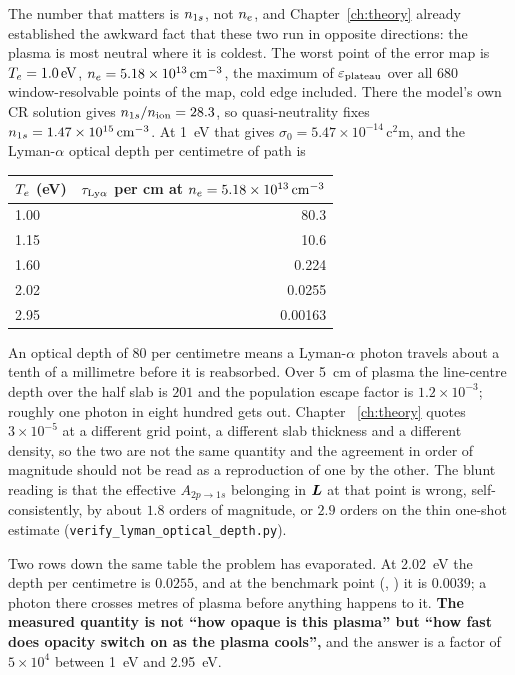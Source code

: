 The number that matters is $n_{1s}$, not $n_e$, and Chapter~\ref{ch:theory}
already established the awkward fact that these two run in opposite directions:
the plasma is most neutral where it is coldest. The worst point of the error map
is $T_e = \SI{1.0}{\electronvolt}$,
$n_e = 5.18\times10^{13}\,\si{\per\cubic\centi\metre}$, the maximum of
$\varepsilon_{\mathrm{plateau}}$ over all $680$ window-resolvable points of the map, cold edge
included. There the model's own CR solution gives $n_{1s}/n_{\mathrm{ion}} = 28.3$, so
quasi-neutrality fixes
$n_{1s} = 1.47\times10^{15}\,\si{\per\cubic\centi\metre}$. At
\SI{1}{\electronvolt} that gives
$\sigma_0 = 5.47\times10^{-14}\,\si{\square\centi\metre}$, and the Lyman-$\alpha$
optical depth per centimetre of path is

\begin{center}
\begin{tabular}{lr}
  \toprule
  $T_e$ (eV) & $\tau_{\rm Ly\alpha}$ per \si{\centi\metre} at
              $n_e = 5.18\times10^{13}\,\si{\per\cubic\centi\metre}$ \\
  \midrule
  1.00 & 80.3 \\
  1.15 & 10.6 \\
  1.60 & 0.224 \\
  2.02 & 0.0255 \\
  2.95 & 0.00163 \\
  \bottomrule
\end{tabular}
\end{center}

\noindent An optical depth of $80$ per centimetre means a Lyman-$\alpha$ photon
travels about a tenth of a millimetre before it is reabsorbed. Over
\SI{5}{\centi\metre} of plasma the line-centre depth
over the half slab is $201$ and the population escape factor is
$1.2\times10^{-3}$; roughly one photon in eight hundred gets out. Chapter~%
\ref{ch:theory} quotes $3\times10^{-5}$ at a different grid point, a different
slab thickness and a different density, so the two are not the same quantity and
the agreement in order of magnitude should not be read as a reproduction of
one by the other.
The blunt reading is that the effective $A_{2p\to1s}$ belonging in $\bm{L}$ at
that point is wrong, self-consistently, by about $1.8$ orders of magnitude, or
$2.9$ orders on the thin one-shot estimate
(\texttt{verify\_lyman\_optical\_depth.py}).

Two rows down the same table the problem has evaporated. At
\SI{2.02}{\electronvolt} the depth per centimetre is $0.0255$, and at the
benchmark point (\benchTe, \benchne) it is $0.0039$; a photon there crosses
metres of plasma before anything happens to it. \textbf{The measured quantity
is not ``how opaque is this plasma'' but ``how fast does opacity switch on as
the plasma cools'',} and the answer is a factor of $5\times10^{4}$ between
\SI{1}{\electronvolt} and \SI{2.95}{\electronvolt}.

